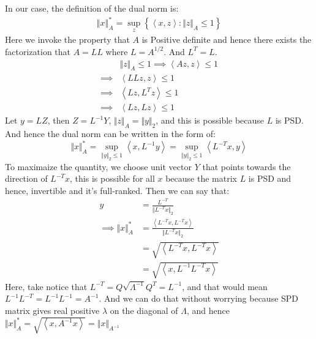 \documentclass[]{article}
\begin{document}
    In our case, the definition of the dual norm is: 
    \begin{align*}\tag{1.2.3}\label{eqn:1.2.3}
        \left\Vert
             x
        \right\Vert_A^* = 
        \sup_{z}\left\lbrace
            \left\langle x, z \right\rangle: \Vert z\Vert_A \le 1
        \right\rbrace
    \end{align*}
    Here we invoke the property that $A$ is Positive definite and hence there exists the factorization that $A = LL$ where $L = A^{1/2}$. And $L^T = L$. 
    \begin{align*}\tag{1.2.4}\label{eqn:1.2.4}
        & \Vert z\Vert_A \le 1 \implies \left\langle Az, z \right\rangle\le 1
        \\
        \implies 
        &
        \left\langle LLz, z \right\rangle\le 1
        \\
        \implies &
        \left\langle Lz, L^Tz \right\rangle \le 1
        \\
        \implies &
        \left\langle Lz, Lz \right\rangle \le 1
    \end{align*}
    Let $y = LZ$, then $Z = L^{-1}Y$, $\Vert z \Vert_A = \Vert y\Vert_2$, and this is possible because $L$ is PSD. And hence the dual norm can be written in the form of: 
    $$
        \Vert x\Vert_A^* = \sup_{\Vert y\Vert_2 \le 1} \left\langle x, L^{-1}y  \right\rangle = \sup_{\Vert y\Vert_2 \le 1} \left\langle L^{-T}x, y \right\rangle
    $$
    To maximaize the quantity, we choose unit vector $Y$ that points towards the direction of $L^{-T}x$, this is possible for all $x$ because the matrix $L$ is PSD and hence, invertible and it's full-ranked. Then we can say that: 
    \begin{align*}\tag{1.2.5}\label{eqn:1.2.5}
        y &= \frac{L^{-T}}{\Vert L^{-T}x\Vert_2} 
        \\
        \implies  \Vert x\Vert_A^* 
        &= \frac{
            \left\langle L^{-T}x, L^{-T}x \right\rangle
        }{
            \Vert L^{-T}x\Vert_2
        }
        \\
        &= \sqrt{\left\langle L^{-T}x, L^{-T}x \right\rangle}
        \\
        &= \sqrt{\left\langle x, L^{-1}L^{-T}x \right\rangle}
    \end{align*}
    Here, take notice that $L^{-T} = Q \sqrt{\Lambda^{-1}} Q^T = L^{-1}$, and that would mean $L^{-1}L^{-T}=L^{-1}L^{-1} = A^{-1}$. And we can do that without worrying because SPD matrix gives real positive $\lambda$ on the diagonal of $\Lambda$, and hence $\Vert x\Vert_A^* = \sqrt{\left\langle  x, A^{-1}x\right\rangle} = \Vert x\Vert_{A^{-1}}$
\end{document}
